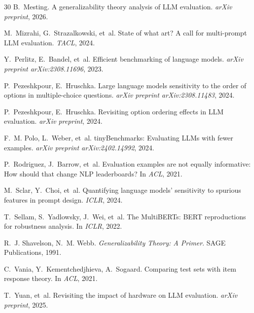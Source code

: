 \documentclass[11pt]{article}
\begin{document}
\begin{thebibliography}{30}
B.~Mesting.
\newblock A generalizability theory analysis of LLM evaluation.
\newblock \emph{arXiv preprint}, 2026.

M.~Mizrahi, G.~Strazalkowski, et~al.
\newblock State of what art? A call for multi-prompt LLM evaluation.
\newblock \emph{TACL}, 2024.

Y.~Perlitz, E.~Bandel, et~al.
\newblock Efficient benchmarking of language models.
\newblock \emph{arXiv preprint arXiv:2308.11696}, 2023.

P.~Pezeshkpour, E.~Hruschka.
\newblock Large language models sensitivity to the order of options in multiple-choice questions.
\newblock \emph{arXiv preprint arXiv:2308.11483}, 2024{}.

P.~Pezeshkpour, E.~Hruschka.
\newblock Revisiting option ordering effects in LLM evaluation.
\newblock \emph{arXiv preprint}, 2024{}.

F.~M. Polo, L.~Weber, et~al.
\newblock tinyBenchmarks: Evaluating LLMs with fewer examples.
\newblock \emph{arXiv preprint arXiv:2402.14992}, 2024.

P.~Rodriguez, J.~Barrow, et~al.
\newblock Evaluation examples are not equally informative: How should that change NLP leaderboards?
\newblock In \emph{ACL}, 2021.

M.~Sclar, Y.~Choi, et~al.
\newblock Quantifying language models' sensitivity to spurious features in prompt design.
\newblock \emph{ICLR}, 2024.

T.~Sellam, S.~Yadlowsky, J.~Wei, et~al.
\newblock The MultiBERTs: BERT reproductions for robustness analysis.
\newblock In \emph{ICLR}, 2022.

R.~J. Shavelson, N.~M. Webb.
\newblock \emph{Generalizability Theory: A Primer}.
\newblock SAGE Publications, 1991.

C.~Vania, Y.~Kementchedjhieva, A.~Sogaard.
\newblock Comparing test sets with item response theory.
\newblock In \emph{ACL}, 2021.

T.~Yuan, et~al.
\newblock Revisiting the impact of hardware on LLM evaluation.
\newblock \emph{arXiv preprint}, 2025.

\end{thebibliography}
\end{document}
